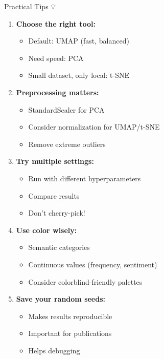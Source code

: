 \documentclass[aspectratio=169]{beamer}
\begin{document}
\begin{frame}[shrink=10]{Practical Tips 💡}
\begin{enumerate}\setlength{\itemsep}{0pt}
    \item \textbf{Choose the right tool:}
    \begin{itemize}\setlength{\itemsep}{0pt}
        \item Default: UMAP (fast, balanced)
        \item Need speed: PCA
        \item Small dataset, only local: t-SNE
    \end{itemize}

    \item \textbf{Preprocessing matters:}
    \begin{itemize}\setlength{\itemsep}{0pt}
        \item StandardScaler for PCA
        \item Consider normalization for UMAP/t-SNE
        \item Remove extreme outliers
    \end{itemize}

    \item \textbf{Try multiple settings:}
    \begin{itemize}\setlength{\itemsep}{0pt}
        \item Run with different hyperparameters
        \item Compare results
        \item Don't cherry-pick!
    \end{itemize}

    \item \textbf{Use color wisely:}
    \begin{itemize}\setlength{\itemsep}{0pt}
        \item Semantic categories
        \item Continuous values (frequency, sentiment)
        \item Consider colorblind-friendly palettes
    \end{itemize}

    \item \textbf{Save your random seeds:}
    \begin{itemize}\setlength{\itemsep}{0pt}
        \item Makes results reproducible
        \item Important for publications
        \item Helps debugging
    \end{itemize}


\end{enumerate}
\end{frame}
\end{document}
